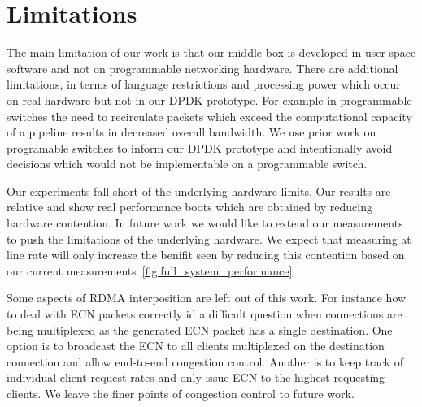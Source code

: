 \section{Limitations}

The main limitation of our work is that our middle box is developed in user
space software and not on programmable networking hardware. There are additional
limitations, in terms of language restrictions and processing power which occur
on real hardware but not in our DPDK prototype. For example in programmable
switches the need to recirculate packets which exceed the computational capacity
of a pipeline results in decreased overall bandwidth. We use prior work on
programable switches to inform our DPDK prototype and intentionally avoid
decisions which would not be implementable on a programmable switch.

Our experiments fall short of the underlying hardware limits. Our results are
relative and show real performance boots which are obtained by reducing hardware
contention. In future work we would like to extend our measurements to push the
limitations of the underlying hardware. We expect that measuring at line rate
will only increase the benifit seen by reducing this contention based on our
current measurements~\ref{fig:full_system_performance}.

Some aspects of RDMA interposition are left out of this work. For instance how
to deal with ECN packets correctly id a difficult question when connections are
being multiplexed as the generated ECN packet has a single destination. One
option is to broadcast the ECN to all clients multiplexed on the destination
connection and allow end-to-end congestion control. Another is to keep track of
individual client request rates and only issue ECN to the highest requesting
clients. We leave the finer points of congestion control to future work.